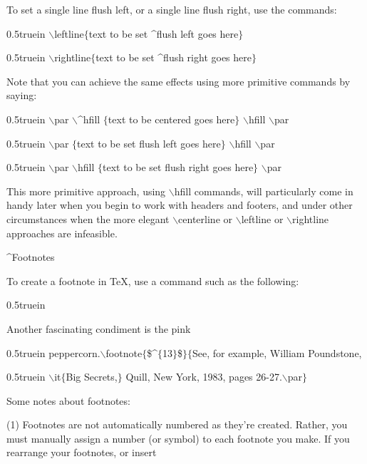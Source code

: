 \bigskip\par\noindent
To set a single line flush left, or a single line flush
right, use the commands:
\bigskip\par\noindent\hglue 0.5truein
{\twltt $\backslash$leftline$\{$text to be set ^{flush left} goes here$\}$}
\bigskip\par\noindent\hglue 0.5truein
{\twltt $\backslash$rightline$\{$text to be set ^{flush right} goes here$\}$}
\bigskip\par\noindent
Note that you can achieve the same effects using more primitive
commands by saying:
\bigskip\par\noindent\hglue 0.5truein
{\twltt $\backslash$par $\backslash$^{hfill} $\{$text to be centered goes 
here$\}$ $\backslash$hfill $\backslash$par}
\bigskip\par\noindent\hglue 0.5truein
{\twltt $\backslash$par $\{$text to be set flush left goes here$\}$ $\backslash$hfill $\backslash$par}
\bigskip\par\noindent\hglue 0.5truein
{\twltt $\backslash$par
$\backslash$hfill $\{$text to be set flush right goes here$\}$ $\backslash$par}
\bigskip\par\noindent
This more primitive approach, using {\twltt $\backslash$hfill} commands, will
particularly come in handy later when you begin to work with headers and
footers, and under other circumstances when the more elegant {\twltt
$\backslash$centerline} or {\twltt $\backslash$leftline} or 
{\twltt $\backslash$rightline} approaches are infeasible.
\vfill\eject
\centerline{\twlbf ^{Footnotes}}
\bigskip\par\noindent
To create a footnote in \TeX{}, use a command such as the following:
\bigskip\par\noindent\hglue 0.5truein
{\twltt Another fascinating condiment is the pink
\par\noindent\hglue 0.5truein
peppercorn.$\backslash$footnote$\{${}\${}\^{}$\{$13$\}${}\${}$\}${}$\{$See, %
for example, William Poundstone, 
\par\noindent\hglue 0.5truein
$\backslash$it$\{$Big Secrets,$\}$ 
Quill, New York, 1983, pages 26-27.$\backslash$par$\}$}
\par\noindent\bigskip
Some notes about footnotes:
\bigskip\par\noindent
(1) Footnotes are not automatically numbered as they're created. 
Rather, you must manually assign a number (or symbol) to each 
footnote you make. If you rearrange your footnotes, or insert
